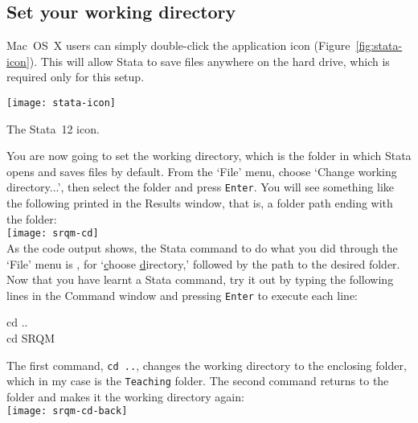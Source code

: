 	\subsection{Set your working directory}%
		\label{sec:working-directory}%

   Mac~OS~X users can simply double-click the application icon (Figure~\ref{fig:stata-icon}).  This will allow Stata to save files anywhere on the hard drive, which is required only for this setup.%

		\begin{marginfigure}
			\texttt{[image: stata-icon]}
			\caption{The Stata~12 icon.}
			\label{fig:stata-icon}
	  \end{marginfigure}
	 
	You are now going to set the working directory, which is the folder in which Stata opens and saves files by default. From the `File' menu, choose `Change working directory...', then select the \SRQM folder and press \texttt{Enter}. You will see something like the following printed in the Results window, that is, a folder path ending with the \SRQM folder:\\[1em]%
	
		\texttt{[image: srqm-cd]}\\[1em]

	As the code output shows, the Stata command to do what you did through the `File' menu is , for `\underline{c}hoose \underline{d}irectory,' followed by the path to the desired folder. Now that you have learnt a Stata command, try it out by typing the following lines in the Command window and pressing \texttt{Enter} to execute each line:%
	
	\begin{docspec}
		cd ..\\
		cd SRQM
	\end{docspec}
	
	The first command, \texttt{cd ..}, changes the working directory to the enclosing folder, which in my case is the \texttt{Teaching} folder. The second command returns to the \SRQM folder and makes it the working directory again:\\[1em]%
		
	\texttt{[image: srqm-cd-back]}\\[1em]
	
